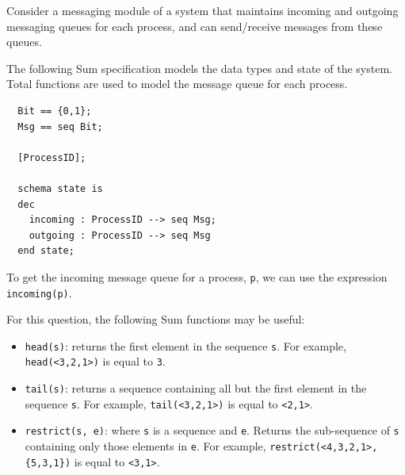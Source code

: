 

Consider a messaging module of a system that maintains incoming and outgoing messaging queues for each process, and can send/receive messages from these queues.

The following Sum specification models the data types and state of the system. Total functions are used to model the message queue for each process.

\begin{verbatim}
  Bit == {0,1};
  Msg == seq Bit;

  [ProcessID];

  schema state is
  dec
    incoming : ProcessID --> seq Msg;
    outgoing : ProcessID --> seq Msg
  end state;
\end{verbatim}

To get the incoming message queue for a process, \verb+p+, we can use the expression \verb+incoming(p)+. 

For this question, the following Sum functions may be useful:

\begin{itemize}
  \item \verb+head(s)+: returns the first element in the sequence \verb+s+. For example, \verb+head(<3,2,1>)+ is equal to \verb+3+.
  \item \verb+tail(s)+: returns a sequence containing all but the first element in the sequence \verb+s+. For example, \verb+tail(<3,2,1>)+ is equal to \verb+<2,1>+.
  \item \verb+restrict(s, e)+: where \verb+s+ is a sequence and \verb+e+. Returns the sub-sequence of \verb+s+ containing only those elements in \verb+e+. For example, \verb+restrict(<4,3,2,1>, {5,3,1})+ is equal to \verb+<3,1>+.
\end{itemize}

